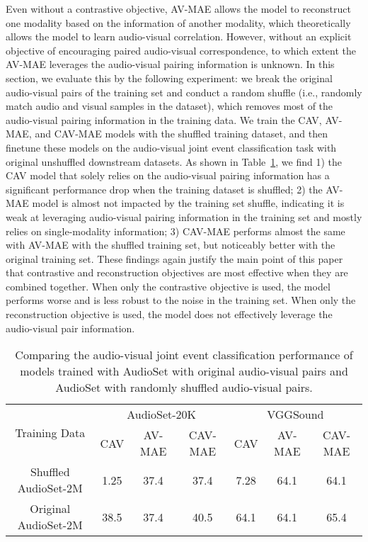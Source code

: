 \documentclass{article} \usepackage{iclr2023_conference,times}
\begin{document}
Even without a contrastive objective, AV-MAE allows the model to reconstruct one modality based on the information of another modality, which theoretically allows the model to learn audio-visual correlation. However, without an explicit objective of encouraging paired audio-visual correspondence, to which extent the AV-MAE leverages the audio-visual pairing information is unknown. In this section, we evaluate this by the following experiment: we break the original audio-visual pairs of the training set and conduct a random shuffle (i.e., randomly match audio and visual samples in the dataset), which removes most of the audio-visual pairing information in the training data. We train the CAV, AV-MAE, and CAV-MAE models with the shuffled training dataset, and then finetune these models on the audio-visual joint event classification task with original unshuffled downstream datasets. As shown in Table~\ref{tab:shuffle}, we find 1) the CAV model that solely relies on the audio-visual pairing information has a significant performance drop when the training dataset is shuffled; 2) the AV-MAE model is almost not impacted by the training set shuffle, indicating it is weak at leveraging audio-visual pairing information in the training set and mostly relies on single-modality information; 3) CAV-MAE performs almost the same with AV-MAE with the shuffled training set, but noticeably better with the original training set. These findings again justify the main point of this paper that contrastive and reconstruction objectives are most effective when they are combined together. When only the contrastive objective is used, the model performs worse and is less robust to the noise in the training set. When only the reconstruction objective is used, the model does not effectively leverage the audio-visual pair information. 

\begin{table}[h]
\centering
\caption{Comparing the audio-visual joint event classification performance of models trained with AudioSet with original audio-visual pairs and AudioSet with randomly shuffled audio-visual pairs.}
\label{tab:shuffle}
\begin{tabular}{@{}ccccccc@{}}
\toprule
\multirow{2}{*}{Training Data} & \multicolumn{3}{c}{AudioSet-20K} & \multicolumn{3}{c}{VGGSound} \\ \cmidrule(l){2-7} 
                               & CAV     & AV-MAE    & CAV-MAE    & CAV    & AV-MAE   & CAV-MAE  \\ \midrule
Shuffled AudioSet-2M           & 1.25    & 37.4      & 37.4       & 7.28   & 64.1     & 64.1     \\
Original AudioSet-2M           & 38.5    & 37.4      & 40.5       & 64.1   & 64.1     & 65.4     \\ \bottomrule
\end{tabular}
\end{table}
\end{document}
